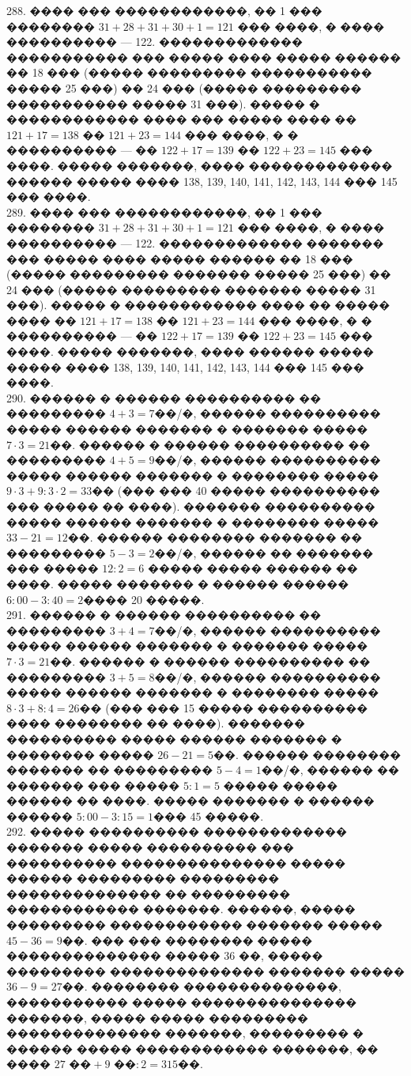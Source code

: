 \documentclass[12pt]{article}
\begin{document}
288. ���� ��� ������������, �� 1 ��� �������� $31+28+31+30+1=121$ ��� ����, � ���� ���������� --- 122. ������������� ����������� ��� ����� ���� ����� ������ �� 18 ��� (����� ��������� ����������� ����� 25 ���) �� 24 ��� (����� ��������� ����������� ����� 31 ���). ����� � ������������ ���� ��� ����� ���� �� $121+17=138$ �� $121+23=144$ ��� ����, � � ���������� --- �� $122+17=139$ �� $122+23=145$ ��� ����. ����� �������, ���� ������������� ������ ����� ���� 138, 139, 140, 141, 142, 143, 144 ��� 145 ��� ����.\\
289. ���� ��� ������������, �� 1 ��� �������� $31+28+31+30+1=121$ ��� ����, � ���� ���������� --- 122. ������������� ������� ��� ����� ���� ����� ������ �� 18 ��� (����� ��������� ������� ����� 25 ���) �� 24 ��� (����� ��������� ������� ����� 31 ���). ����� � ������������ ���� �� ����� ���� �� $121+17=138$ �� $121+23=144$ ��� ����, � � ���������� --- �� $122+17=139$ �� $122+23=145$ ��� ����. ����� �������, ���� ������ ����� ����� ���� 138, 139, 140, 141, 142, 143, 144 ��� 145 ��� ����.\\
290. ������ � ������ ���������� �� ��������� $4+3=7$��/�, ������ ���������� ����� ������ ������� � ������� ����� $7\cdot3=21$��. ������ � ������ ���������� �� ��������� $4+5=9$��/�, ������ ���������� ����� ������ ������� � �������� ����� $9\cdot3+9:3\cdot2=33$�� (��� ��� 40 ����� ���������� ��� ����� �� ����). ������� ���������� ����� ������ ������� � �������� ����� $33-21=12$��. ������ �������� ������� �� ��������� $5-3=2$��/�, ������ �� ������� ��� ����� $12:2=6$ ����� ����� ������ �� ����. ����� ������� � ������ ������ $6:00-3:40=2$���� 20 �����.\\
291. ������ � ������ ���������� �� ��������� $3+4=7$��/�, ������ ���������� ����� ������ ������� � ������� ����� $7\cdot3=21$��. ������ � ������ ���������� �� ��������� $3+5=8$��/�, ������ ���������� ����� ������ ������� � �������� ����� $8\cdot3+8:4=26$�� (��� ��� 15 ����� ���������� ���� �������� �� ����). ������� ���������� ����� ������ ������� � �������� ����� $26-21=5$��. ������ �������� ������� �� ��������� $5-4=1$��/�, ������ �� ������� ��� ����� $5:1=5$ ����� ����� ������ �� ����. ����� ������� � ������ ������ $5:00-3:15=1$��� 45 �����.\\
292. ����� ���������� ������������� ������� ����� ���������� ��� ���������� ��������������� ����� ������ ��������� ��������� �������������� �� ��������� ������������ �������. ������, ����� ��������� ������������ ������� ����� $45-36=9$��. ��� ��� �������� ����� �������������� ����� 36 ��, ����� ��������� �������������� ������� ����� $36-9=27$��. �������� ��������������, ����������� ����� ��������������� �������, ����� ����� ��������� �������������� �������, ��������� � ������ ����� ������������ �������, �� ���� $27\text{ ��}+9\text{ ��}:2=315$��.\\
\end{document}

